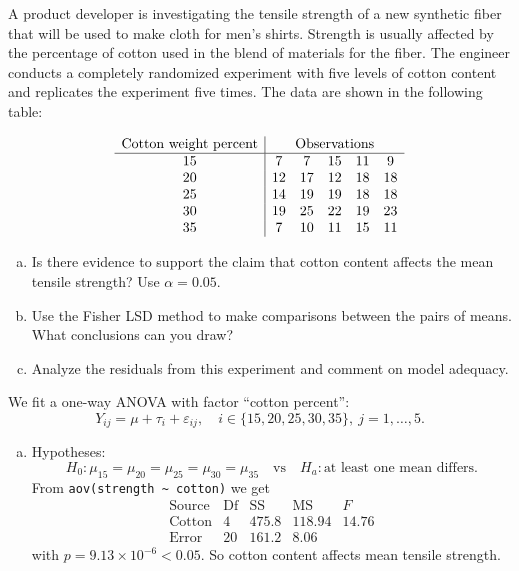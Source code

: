 \documentclass[answers,12pt,addpoints]{exam}
\begin{document}
\begin{questions}
A product developer is investigating the tensile strength of a new synthetic fiber that will be used to make cloth for men's shirts. Strength is usually affected by the percentage of cotton used in the blend of materials for the fiber. The engineer conducts a completely randomized experiment with five levels of cotton content and replicates the experiment five times. The data are shown in the following table:

\[
\begin{array}{c|ccccc}
\text{Cotton weight percent} & \multicolumn{5}{c}{\text{Observations}}\\
\hline
15 & 7 & 7 & 15 & 11 & 9\\
20 & 12 & 17 & 12 & 18 & 18\\
25 & 14 & 19 & 19 & 18 & 18\\
30 & 19 & 25 & 22 & 19 & 23\\
35 & 7 & 10 & 11 & 15 & 11
\end{array}
\]

\begin{enumerate}[(a)]
\item Is there evidence to support the claim that cotton content affects the mean tensile strength? Use $\alpha = 0.05$.
\item Use the Fisher LSD method to make comparisons between the pairs of means. What conclusions can you draw?
\item Analyze the residuals from this experiment and comment on model adequacy.
\end{enumerate}

\begin{solution}
We fit a one-way ANOVA with factor “cotton percent”:
\[
Y_{ij} = \mu + \tau_i + \varepsilon_{ij},\quad i \in \{15,20,25,30,35\},\ j=1,\dots,5.
\]

\begin{enumerate}[(a)]
\item Hypotheses:
\[
H_0:\mu_{15}=\mu_{20}=\mu_{25}=\mu_{30}=\mu_{35}
\quad\text{vs}\quad
H_a:\text{at least one mean differs}.
\]
From \verb|aov(strength ~ cotton)| we get
\[
\begin{array}{l|rrrr}
\text{Source} & \text{Df} & \text{SS} & \text{MS} & F \\
\hline
\text{Cotton} & 4 & 475.8 & 118.94 & 14.76 \\
\text{Error}  & 20& 161.2 & 8.06   &
\end{array}
\]
with $p = 9.13\times 10^{-6} < 0.05$. So cotton content affects mean tensile strength.


\end{enumerate}
\end{solution}
\end{questions}
\end{document}
